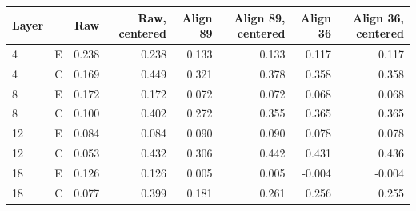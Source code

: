\begin{tabular}{llrrrrrr}
\toprule
Layer &  & Raw & Raw, centered & Align 89 & Align 89, centered & Align 36 & Align 36, centered \\
\midrule
4 & E & 0.238 & 0.238 & 0.133 & 0.133 & 0.117 & 0.117 \\
4 & C & 0.169 & 0.449 & 0.321 & 0.378 & 0.358 & 0.358 \\
8 & E & 0.172 & 0.172 & 0.072 & 0.072 & 0.068 & 0.068 \\
8 & C & 0.100 & 0.402 & 0.272 & 0.355 & 0.365 & 0.365 \\
12 & E & 0.084 & 0.084 & 0.090 & 0.090 & 0.078 & 0.078 \\
12 & C & 0.053 & 0.432 & 0.306 & 0.442 & 0.431 & 0.436 \\
18 & E & 0.126 & 0.126 & 0.005 & 0.005 & -0.004 & -0.004 \\
18 & C & 0.077 & 0.399 & 0.181 & 0.261 & 0.256 & 0.255 \\
\bottomrule
\end{tabular}

